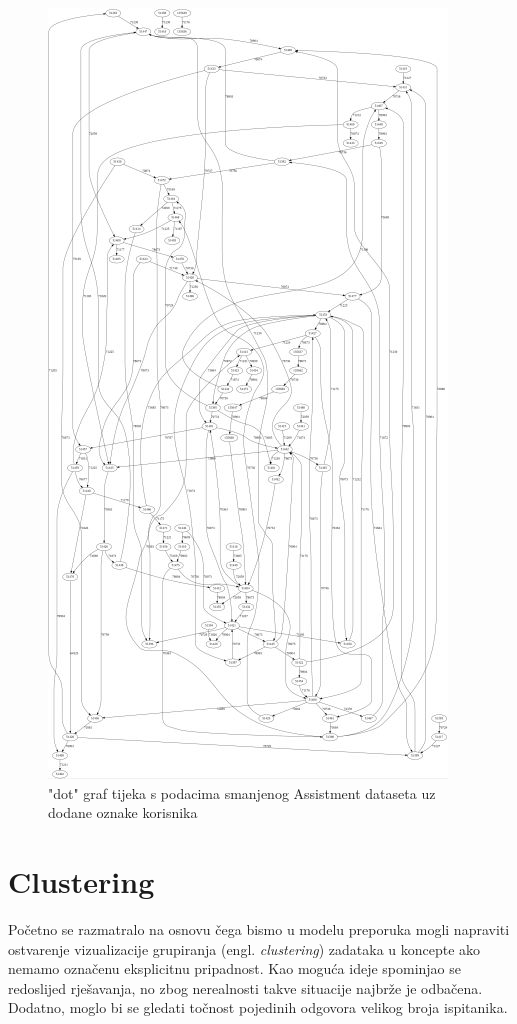 \documentclass[times, utf8,projekt]{fer}
\begin{document}
\begin{figure}[!htb]
\centering
\includegraphics[scale=1]{dot3.jpg}
\caption{"dot" graf tijeka s podacima smanjenog Assistment dataseta uz dodane oznake korisnika}
\label{fig:dot3}
\end{figure}

\chapter{Clustering}
Početno se razmatralo na osnovu čega bismo u modelu preporuka mogli napraviti ostvarenje vizualizacije grupiranja (engl. \textit{clustering}) zadataka u koncepte ako nemamo označenu eksplicitnu pripadnost. Kao moguća ideje spominjao se redoslijed rješavanja, no zbog nerealnosti takve situacije najbrže je odbačena. Dodatno, moglo bi se gledati točnost pojedinih odgovora velikog broja ispitanika.
\end{document}
